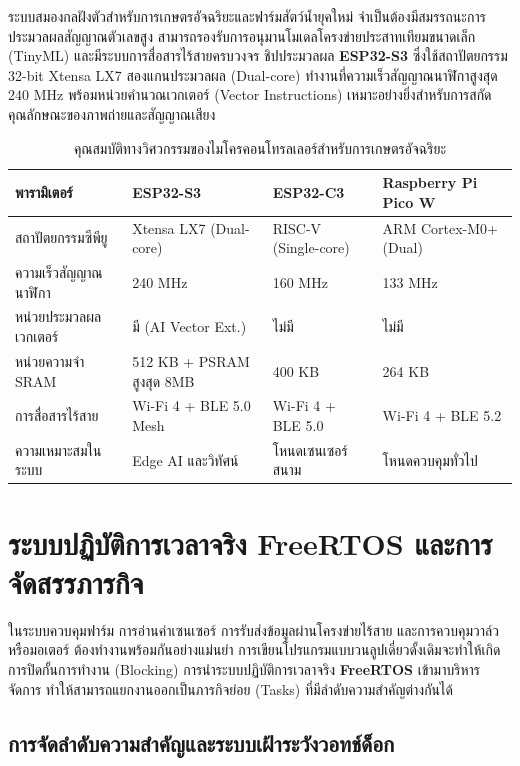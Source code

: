 ระบบสมองกลฝังตัวสำหรับการเกษตรอัจฉริยะและฟาร์มสัตว์น้ำยุคใหม่ จำเป็นต้องมีสมรรถนะการประมวลผลสัญญาณตัวเลขสูง สามารถรองรับการอนุมานโมเดลโครงข่ายประสาทเทียมขนาดเล็ก (TinyML) และมีระบบการสื่อสารไร้สายครบวงจร ชิปประมวลผล \textbf{ESP32-S3} ซึ่งใช้สถาปัตยกรรม 32-bit Xtensa LX7 สองแกนประมวลผล (Dual-core) ทำงานที่ความเร็วสัญญาณนาฬิกาสูงสุด $240\text{ MHz}$ พร้อมหน่วยคำนวณเวกเตอร์ (Vector Instructions) เหมาะอย่างยิ่งสำหรับการสกัดคุณลักษณะของภาพถ่ายและสัญญาณเสียง

\begin{table}[H]
\centering
\caption{คุณสมบัติทางวิศวกรรมของไมโครคอนโทรลเลอร์สำหรับการเกษตรอัจฉริยะ}
\label{tab:mcu_specs}
\begin{tabularx}{\textwidth}{p{3.5cm}YYY}
    \toprule
    \textbf{พารามิเตอร์} & \textbf{ESP32-S3} & \textbf{ESP32-C3} & \textbf{Raspberry Pi Pico W} \\
    \midrule
    สถาปัตยกรรมซีพียู & Xtensa LX7 (Dual-core) & RISC-V (Single-core) & ARM Cortex-M0+ (Dual) \\
    ความเร็วสัญญาณนาฬิกา & 240 MHz & 160 MHz & 133 MHz \\
    หน่วยประมวลผลเวกเตอร์ & มี (AI Vector Ext.) & ไม่มี & ไม่มี \\
    หน่วยความจำ SRAM & 512 KB + PSRAM สูงสุด 8MB & 400 KB & 264 KB \\
    การสื่อสารไร้สาย & Wi-Fi 4 + BLE 5.0 Mesh & Wi-Fi 4 + BLE 5.0 & Wi-Fi 4 + BLE 5.2 \\
    ความเหมาะสมในระบบ & Edge AI และวิทัศน์ & โหนดเซนเซอร์สนาม & โหนดควบคุมทั่วไป \\
    \bottomrule
\end{tabularx}
\end{table}

\section{ระบบปฏิบัติการเวลาจริง FreeRTOS และการจัดสรรภารกิจ}

ในระบบควบคุมฟาร์ม การอ่านค่าเซนเซอร์ การรับส่งข้อมูลผ่านโครงข่ายไร้สาย และการควบคุมวาล์วหรือมอเตอร์ ต้องทำงานพร้อมกันอย่างแม่นยำ การเขียนโปรแกรมแบบวนลูปเดี่ยวดั้งเดิมจะทำให้เกิดการปิดกั้นการทำงาน (Blocking) การนำระบบปฏิบัติการเวลาจริง \textbf{FreeRTOS} เข้ามาบริหารจัดการ ทำให้สามารถแยกงานออกเป็นภารกิจย่อย (Tasks) ที่มีลำดับความสำคัญต่างกันได้

\subsection{การจัดลำดับความสำคัญและระบบเฝ้าระวังวอทช์ด็อก}


